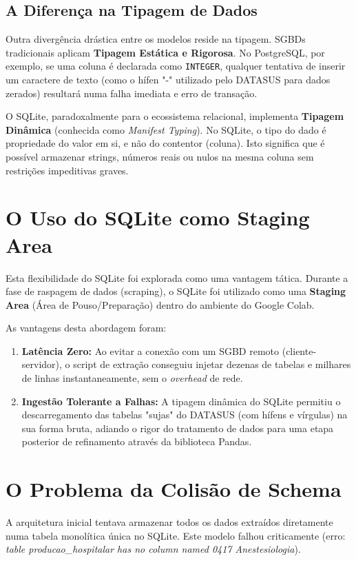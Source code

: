 \documentclass[12pt,a4paper]{report}
\begin{document}
\subsection{A Diferença na Tipagem de Dados}
Outra divergência drástica entre os modelos reside na tipagem. SGBDs tradicionais aplicam \textbf{Tipagem Estática e Rigorosa}. No PostgreSQL, por exemplo, se uma coluna é declarada como \texttt{INTEGER}, qualquer tentativa de inserir um caractere de texto (como o hífen "-" utilizado pelo DATASUS para dados zerados) resultará numa falha imediata e erro de transação.

O SQLite, paradoxalmente para o ecossistema relacional, implementa \textbf{Tipagem Dinâmica} (conhecida como \textit{Manifest Typing}). No SQLite, o tipo do dado é propriedade do valor em si, e não do contentor (coluna). Isto significa que é possível armazenar strings, números reais ou nulos na mesma coluna sem restrições impeditivas graves.

\section{O Uso do SQLite como Staging Area}
Esta flexibilidade do SQLite foi explorada como uma vantagem tática. Durante a fase de raspagem de dados (scraping), o SQLite foi utilizado como uma \textbf{Staging Area} (Área de Pouso/Preparação) dentro do ambiente do Google Colab.

As vantagens desta abordagem foram:
\begin{enumerate}
\item \textbf{Latência Zero:} Ao evitar a conexão com um SGBD remoto (cliente-servidor), o script de extração conseguiu injetar dezenas de tabelas e milhares de linhas instantaneamente, sem o \textit{overhead} de rede.
\item \textbf{Ingestão Tolerante a Falhas:} A tipagem dinâmica do SQLite permitiu o descarregamento das tabelas "sujas" do DATASUS (com hífens e vírgulas) na sua forma bruta, adiando o rigor do tratamento de dados para uma etapa posterior de refinamento através da biblioteca Pandas.
\end{enumerate}

\section{O Problema da Colisão de Schema}
A arquitetura inicial tentava armazenar todos os dados extraídos diretamente numa tabela monolítica única no SQLite. Este modelo falhou criticamente (erro: \textit{table producao\_hospitalar has no column named 0417 Anestesiologia}).
\end{document}
